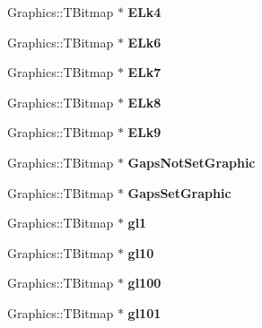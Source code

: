 \begin{DoxyCompactItemize}
Graphics\+::\+T\+Bitmap $\ast$ {\bfseries E\+Lk4}
\item 
\mbox{\label{class_t_rail_graphics_a6c650f7f1bd198a8ff32493bf9fd1d39}} 
Graphics\+::\+T\+Bitmap $\ast$ {\bfseries E\+Lk6}
\item 
\mbox{\label{class_t_rail_graphics_a6cd5ddf6c5fcbb45a9d997d45ead6029}} 
Graphics\+::\+T\+Bitmap $\ast$ {\bfseries E\+Lk7}
\item 
\mbox{\label{class_t_rail_graphics_ac4672f62605e295b3566b4975af15404}} 
Graphics\+::\+T\+Bitmap $\ast$ {\bfseries E\+Lk8}
\item 
\mbox{\label{class_t_rail_graphics_a9c3004287d49e75b8f86b8c42ba59c27}} 
Graphics\+::\+T\+Bitmap $\ast$ {\bfseries E\+Lk9}
\item 
\mbox{\label{class_t_rail_graphics_ab54fc78d19610835fa08fe024fc2a677}} 
Graphics\+::\+T\+Bitmap $\ast$ {\bfseries Gaps\+Not\+Set\+Graphic}
\item 
\mbox{\label{class_t_rail_graphics_aa611c7b6d5ca80e1f56668d79465b977}} 
Graphics\+::\+T\+Bitmap $\ast$ {\bfseries Gaps\+Set\+Graphic}
\item 
\mbox{\label{class_t_rail_graphics_a30dbfacc916fb168943844d8755e48d8}} 
Graphics\+::\+T\+Bitmap $\ast$ {\bfseries gl1}
\item 
\mbox{\label{class_t_rail_graphics_a81d2ec52136194a8b5d36d17e2b17d64}} 
Graphics\+::\+T\+Bitmap $\ast$ {\bfseries gl10}
\item 
\mbox{\label{class_t_rail_graphics_ace5d8fcc8e608c6fb509db06954a409f}} 
Graphics\+::\+T\+Bitmap $\ast$ {\bfseries gl100}
\item 
\mbox{\label{class_t_rail_graphics_a1781f881bf91f9679491a781b3bb4833}} 
Graphics\+::\+T\+Bitmap $\ast$ {\bfseries gl101}
\item 
\mbox{\label{class_t_rail_graphics_a691f117067fc89784eab4de0bd44b706}} 

\end{DoxyCompactItemize}
